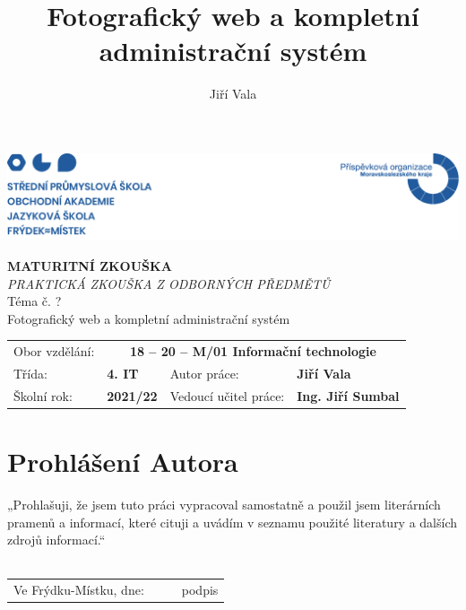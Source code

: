\documentclass[12pt,a4paper]{report}
\title{Fotografický web a kompletní administrační systém}
\author{Jiří Vala}
\date{}
\begin{document}
\begin{titlepage}
  \begin{adjustwidth}{-20mm}{-7.5mm} 
		\vspace*{-1.5cm}
		\noindent\includegraphics[width=\linewidth]{header.png}
	\end{adjustwidth}
	\begin{center}
		\vspace*{0.2cm}
		\Huge\textbf{MATURITNÍ ZKOUŠKA}
		\vspace*{1cm} \\
		\large \emph{PRAKTICKÁ ZKOUŠKA Z ODBORNÝCH PŘEDMĚTŮ}
		\vspace*{1cm} \\
		\Large Téma č. ? \\
		\vspace*{1cm}
		\Large Fotografický web a kompletní administrační systém \\
		\vfill
		\normalsize
	\end{center}
	\begin{tabularx}{\textwidth}{l@{\hskip 0.5cm}XXl}
		Obor vzdělání: & \multicolumn{3}{c}{\textbf{18 – 20 – M/01 Informační technologie}} \\[10pt]
		Třída: & \textbf{4. IT} & Autor práce: & \textbf{Jiří Vala} \\[10pt]
		Školní rok: & \textbf{2021/22} & Vedoucí učitel práce: & \textbf{Ing. Jiří Sumbal}
		\vspace*{1cm}
	\end{tabularx}
\end{titlepage}

\section*{Prohlášení Autora}
  „Prohlašuji, že jsem tuto práci vypracoval samostatně a použil jsem literárních pramenů a informací, které cituji a uvádím v seznamu použité literatury a dalších zdrojů informací.“ \\
	\vspace*{0.5cm} \\
	\renewcommand{\arraystretch}{2}
	\begin{tabularx}{\textwidth}{l@{\hskip 0.75cm}X@{\hskip 1.5cm}X@{\hskip 0.75cm}l}
		Ve Frýdku-Místku, dne: & \dotfill & \dotfill & podpis \\
	\end{tabularx}
  \clearpage
\end{document}
